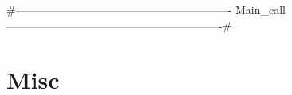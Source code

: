 {#----------------------------------------------------------
 Main_call
----------------------------------------------------------#}
\section{Misc}